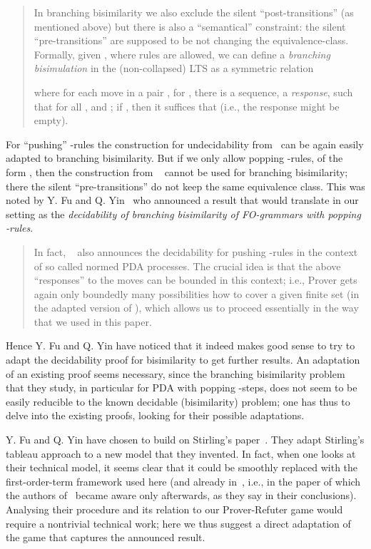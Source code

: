 \documentclass{llncs}
\begin{document}
 
\begin{quote}
{\small
In branching bisimilarity we also exclude the silent
``post-transitions'' (as mentioned above) but there is also a
``semantical'' constraint: the silent ``pre-transitions'' are supposed
to be not changing the equivalence-class.
Formally, given , where rules 
 are allowed,
we can define a \emph{branching bisimulation} 
in the (non-collapsed) LTS 
as a symmetric relation 

where for each 
move  in a pair , for
, 
there is a sequence, a \emph{response},
 such that
 for all
, and ; if , then 
it suffices that  (i.e., the response might be empty). 
}
\end{quote}
For ``pushing'' -rules the construction for
undecidability from~\cite{DBLP:journals/jacm/JancarS08} can be again
easily adapted to branching bisimilarity. But if we only allow 
popping  -rules, of the form 
, then the construction from
~\cite{DBLP:journals/jacm/JancarS08} cannot be used for branching
bisimilarity; there the silent
``pre-transitions'' do not keep the same equivalence class. 
This was noted by
 Y. Fu and Q. Yin~\cite{yuxi-pdadecid-14} who 
announced a result that
would translate in our setting as
the \emph{decidability of branching bisimilarity
of FO-grammars with popping -rules}.
\begin{quote}
{\small
In fact, ~\cite{yuxi-pdadecid-14} also announces the decidability for 
pushing -rules in the context of so called normed PDA
processes. The crucial idea is that the above ``responses''
 to the moves  can be bounded
in this context;
i.e., Prover gets again only boundedly many possibilities how to cover
a given finite set  (in the adapted version of ), which allows us to proceed essentially 
in the way that we used in this paper.
}
\end{quote}
Hence Y. Fu and Q. Yin have noticed that it indeed makes good 
sense to try to
adapt the decidability proof for bisimilarity to get further 
results. An adaptation of an existing proof seems necessary,
since the branching bisimilarity problem that
they study, in particular for PDA with popping -steps,
does not seem to be easily reducible 
to the known decidable (bisimilarity) problem; one has thus to 
delve into the existing proofs, looking for their possible adaptations.

Y. Fu and Q. Yin have chosen to build 
on Stirling's paper~\cite{stirling-pda-00}. They adapt Stirling's
tableau approach to a new model that they invented. In fact, 
when one looks at 
their
technical model, it seems clear that it could be smoothly replaced 
with the first-order-term framework used here 
(and already in~\cite{JancarLICS12}, i.e.,
in the paper of which the authors of~\cite{yuxi-pdadecid-14}
became aware only afterwards, as they say in their conclusions).
Analysing their procedure and its relation to our Prover-Refuter game
would require a nontrivial technical work; here 
we thus suggest 
a direct adaptation of the game that captures the announced result.
\end{document}
